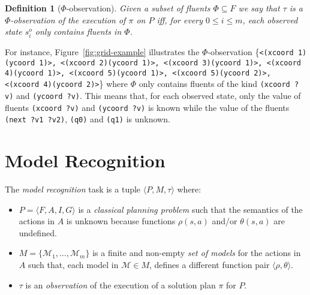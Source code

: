 \documentclass[letterpaper]{article} %
\newcommand{\tup}[1]{{\langle #1 \rangle}}
\newtheorem{definition}[theorem]{Definition}
\begin{document}
\begin{definition}[$\Phi$-observation]
Given a subset of fluents $\Phi\subseteq F$ we say that $\tau$ is a $\Phi$-observation of the execution of $\pi$ on $P$ iff, for every $0\leq i\leq m$, each observed state $s_i^o$ only contains fluents in $\Phi$.
\end{definition}

For instance, Figure~\ref{fig:grid-example} illustrates the $\Phi$-observation \{{\tt\scriptsize<(xcoord 1)(ycoord 1)>, <(xcoord 2)(ycoord 1)>, <(xcoord 3)(ycoord 1)>, <(xcoord 4)(ycoord 1)>, <(xcoord 5)(ycoord 1)>, <(xcoord 5)(ycoord 2)>, <(xcoord 4)(ycoord 2)>}\} where $\Phi$ only contains fluents of the kind {\tt\small (xcoord ?v)} and {\tt\small (ycoord ?v)}. This means that, for each observed state, only the value of fluents {\tt\small (xcoord ?v)} and {\tt\small (ycoord ?v)} is known while the value of the fluents {\tt\small (next ?v1 ?v2)}, {\tt\small (q0)} and {\tt\small (q1)} is unknown.



\section{Model Recognition}
\label{sec:recognition}
The {\em model recognition} task is a tuple $\tup{P,M,\tau}$ where:
\begin{itemize}
\item $P=\tup{F,A,I,G}$ is a {\em classical planning problem} such that the semantics of the actions in $A$ is unknown because functions $\rho(s,a)$ and/or $\theta(s,a)$ are undefined.
\item $M=\{\mathcal{M}_1,\ldots,\mathcal{M}_m\}$ is a finite and non-empty {\em set of models} for the actions in $A$ such that, each model in $\mathcal{M}\in M$, defines a different function pair $\tup{\rho,\theta}$.
\item $\tau$ is an {\em observation} of the execution of a solution plan $\pi$ for $P$.
\end{itemize}
\end{document}
